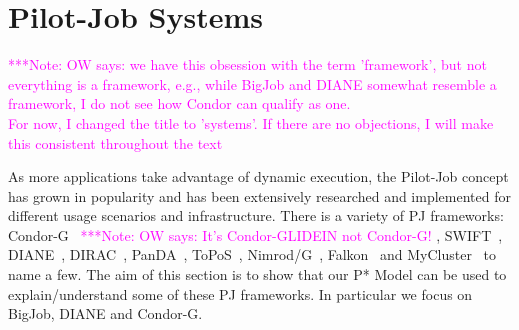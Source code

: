 \documentclass[conference,final]{IEEEtran}
\makeatletter
\def\reduwave{\bgroup \markoverwith{\lower3.5\p@\hbox{\sixly \textcolor{red}{\char58}}}\ULon}
\newcommand{\jwave}[1]{ {\reduwave{#1}}}
\newcommand{\jhanote}[1]{ {\textcolor{red} { ***shantenu: #1 }}}
\newcommand{\alnote}[1]{ {\textcolor{blue} { ***andre: #1 }}}
\newcommand{\note}[1]{ {\textcolor{magenta} { ***Note: #1 }}}
\newcommand{\jwave}[1]{#1}
\newcommand{\alnote}[1]{}
\newcommand{\jhanote}[1]{}
\newcommand{\note}[1]{}
\newcommand{\cu}{CU\xspace}
\newcommand{\upp}{\vspace*{-0.5em}}
\makeatother
\begin{document}


 



\section{Pilot-Job Systems\upp\upp}

\note{OW says: we have this obsession with the term 'framework', but 
not everything is a framework, e.g., while BigJob and DIANE somewhat
resemble a framework, I do not see how Condor can qualify as one.\\
For now, I changed the title to 'systems'. If there are no objections,
I will make this consistent throughout the text}

As more applications take advantage of dynamic execution, the
Pilot-Job concept has grown in popularity and has been extensively
researched and implemented for different usage scenarios and
infrastructure. There is a variety of PJ frameworks:
Condor-G~\cite{condor-g}
\note{OW says: It's Condor-GLIDEIN not Condor-G!}
, SWIFT~\cite{Wilde2011},
DIANE~\cite{Moscicki:908910}, DIRAC~\cite{1742-6596-219-6-062049},
PanDA~\cite{1742-6596-219-6-062041}, ToPoS~\cite{topos},
Nimrod/G~\cite{10.1109/HPC.2000.846563}, Falkon~\cite{1362680} and
MyCluster~\cite{1652061} to name a few. The aim of this section is to
show that our P* Model can be used to explain/understand some of these
PJ frameworks. In particular we focus on BigJob, DIANE and Condor-G.
\end{document}
